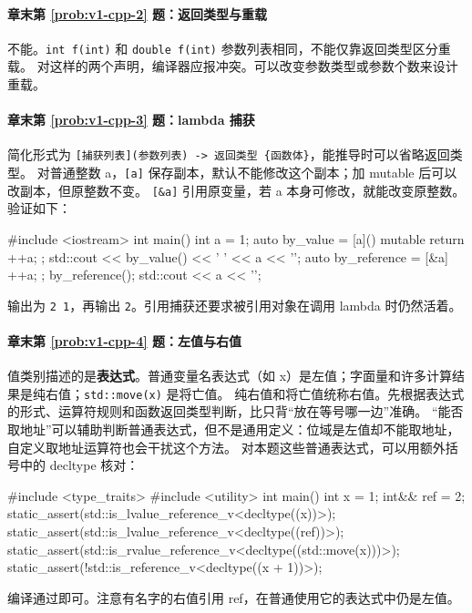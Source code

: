 \paragraph*{章末第 \ref{prob:v1-cpp-2} 题：返回类型与重载}
\begin{solution}
不能。\texttt{int f(int)} 和 \texttt{double f(int)} 参数列表相同，不能仅靠返回类型区分重载。
对这样的两个声明，编译器应报冲突。可以改变参数类型或参数个数来设计重载。
\end{solution}

\paragraph*{章末第 \ref{prob:v1-cpp-3} 题：lambda 捕获}
\begin{solution}
简化形式为 \texttt{[捕获列表](参数列表) -> 返回类型 \{函数体\}}，能推导时可以省略返回类型。
对普通整数 a，\texttt{[a]} 保存副本，默认不能修改这个副本；加 mutable 后可以改副本，但原整数不变。
\texttt{[\&a]} 引用原变量，若 a 本身可修改，就能改变原整数。验证如下：
\begin{tcpp}
#include <iostream>
int main() {
    int a = 1;
    auto by_value = [a]() mutable { return ++a; };
    std::cout << by_value() << ' ' << a << '\n';
    auto by_reference = [&a] { ++a; };
    by_reference();
    std::cout << a << '\n';
}
\end{tcpp}
输出为 \texttt{2 1}，再输出 \texttt{2}。引用捕获还要求被引用对象在调用 lambda 时仍然活着。
\end{solution}

\paragraph*{章末第 \ref{prob:v1-cpp-4} 题：左值与右值}
\begin{solution}
值类别描述的是\textbf{表达式}。普通变量名表达式（如 x）是左值；字面量和许多计算结果是纯右值；\texttt{std::move(x)} 是将亡值。
纯右值和将亡值统称右值。先根据表达式的形式、运算符规则和函数返回类型判断，比只背“放在等号哪一边”准确。
“能否取地址”可以辅助判断普通表达式，但不是通用定义：位域是左值却不能取地址，自定义取地址运算符也会干扰这个方法。
对本题这些普通表达式，可以用额外括号中的 decltype 核对：
\begin{tcpp}
#include <type_traits>
#include <utility>
int main() {
    int x = 1;
    int&& ref = 2;
    static_assert(std::is_lvalue_reference_v<decltype((x))>);
    static_assert(std::is_lvalue_reference_v<decltype((ref))>);
    static_assert(std::is_rvalue_reference_v<decltype((std::move(x)))>);
    static_assert(!std::is_reference_v<decltype((x + 1))>);
}
\end{tcpp}
编译通过即可。注意有名字的右值引用 ref，在普通使用它的表达式中仍是左值。
\end{solution}

